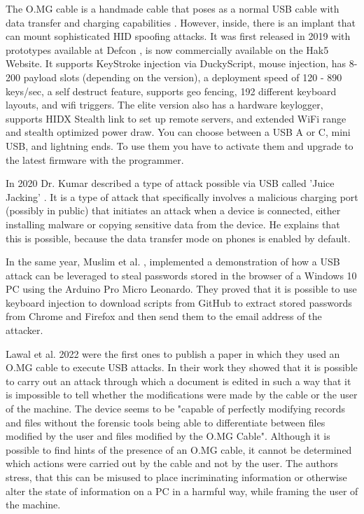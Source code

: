 The O.MG cable is a handmade cable that poses as a normal USB cable with data transfer and charging capabilities \cite{hak5MGCable}. However, inside, there is an implant that can mount sophisticated HID spoofing attacks. It was first released in 2019 with prototypes available at Defcon \cite{MGCable2019a}, is now commercially available on the Hak5 Website. It supports KeyStroke injection via DuckyScript, mouse injection, has 8-200 payload slots (depending on the version), a deployment speed of 120 - 890 keys/sec, a self destruct feature, supports geo fencing, 192 different keyboard layouts, and wifi triggers. The elite version also has a hardware keylogger, supports HIDX Stealth link to set up remote servers, and extended WiFi range and stealth optimized power draw. 
You can choose between a USB A or C, mini USB, and lightning ends. To use them you have to activate them and upgrade to the latest firmware with the programmer. 

In 2020 Dr. Kumar described a type of attack possible via USB called 'Juice Jacking' \cite{kumarJuiceJackingUSB2020}. It is a type of attack that specifically involves a malicious charging port (possibly in public) that initiates an attack when a device is connected, either installing malware or copying sensitive data from the device. He explains that this is possible, because the data transfer mode on phones is enabled by default. 

In the same year, Muslim et al. \cite{muslimImplementationAnalysisUSB2020}, implemented a demonstration of how a USB attack can be leveraged to steal passwords stored in the browser of a Windows 10 PC using the Arduino Pro Micro Leonardo.  They proved that it is possible to use keyboard injection to download scripts from GitHub to extract stored passwords from Chrome and Firefox and then send them to the email address of the attacker. 

Lawal et al. \cite{lawalFacilitatingCyberenabledFraud2022} 2022 were the first ones to publish a paper in which they used an O.MG cable to execute USB attacks. In their work they showed that it is possible to carry out an attack through which a document is edited in such a way that it is impossible to tell whether the modifications were made by the cable or the user of the machine. The device seems to be "capable of perfectly modifying records and files without the forensic tools being able to differentiate between files modified by the user and files modified by the O.MG Cable". Although it is possible to find hints of the presence of an O.MG cable, it cannot be determined which actions were carried out by the cable and not by the user. The authors stress, that this can be misused to place incriminating information or otherwise alter the state of information on a PC in a harmful way, while framing the user of the machine. 



